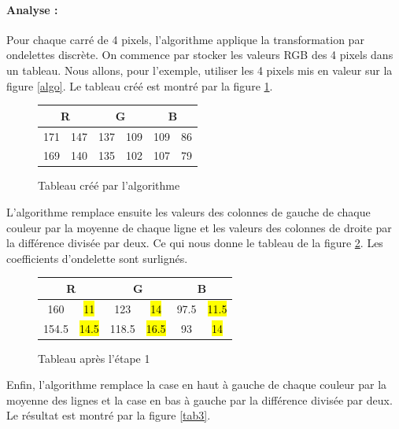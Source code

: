 \documentclass{article}
\begin{document}
\paragraph{Analyse :}

Pour chaque carré de 4 pixels, l'algorithme applique la transformation par ondelettes discrète. On commence par stocker les valeurs RGB des 4 pixels dans un tableau. Nous allons, pour l'exemple, utiliser les 4 pixels mis en valeur sur la figure \ref{algo}. Le tableau créé est montré par la figure \ref{tab1}.

\begin{figure}[!h]
\begin{center}
\begin{tabular}{|c|c|c|c|c|c|}
\hline
\multicolumn{2}{|c|}{R} & \multicolumn{2}{|c|}{G}  & \multicolumn{2}{|c|}{B} \\
\hline
171    & 147   &   137  & 109 &   109  & 86   \\ 
\hline
169    & 140   &   135  & 102 &   107  & 79 \\
\hline
\end{tabular}
\end{center}
\caption{Tableau créé par l'algorithme}
\label{tab1}
\end{figure}


L'algorithme remplace ensuite les valeurs des colonnes de gauche de chaque couleur par la moyenne  de chaque ligne et les valeurs des colonnes de droite par la différence divisée par deux. Ce qui nous donne le tableau de la figure \ref{tab2}. Les coefficients d'ondelette sont surlignés.

\begin{figure}[!h]
\begin{center}
\begin{tabular}{|c|c|c|c|c|c|}
\hline
\multicolumn{2}{|c|}{R} & \multicolumn{2}{|c|}{G}  & \multicolumn{2}{|c|}{B} \\
\hline
160    & \hl{11}   &   123  & \hl{14} &   97.5  & \hl{11.5}   \\ 
\hline
154.5    & \hl{14.5}   &   118.5  & \hl{16.5} &   93  & \hl{14} \\
\hline
\end{tabular}
\end{center}
\caption{Tableau après l'étape 1}
\label{tab2}
\end{figure}


Enfin, l'algorithme remplace la case en haut à gauche de chaque couleur par la moyenne des lignes et la case en bas à gauche par la différence divisée par deux. Le résultat est montré par la figure \ref{tab3}.
\end{document}
